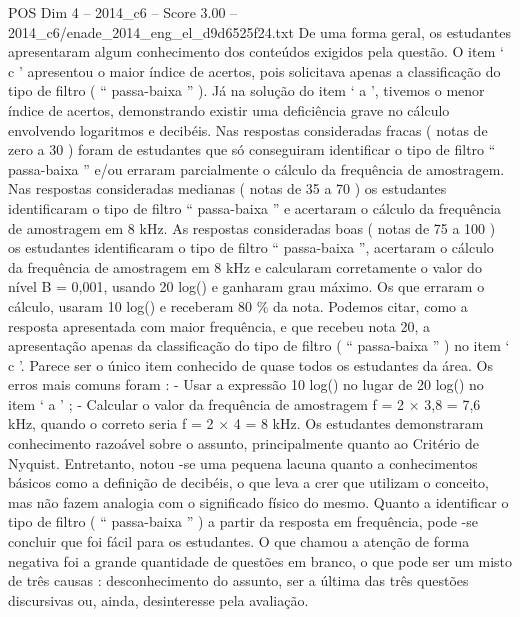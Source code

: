\begin{textsample}{POS Dim 4 – 2014\_c6 – Score 3.00 – 2014\_c6/enade\_2014\_eng\_el\_d9d6525f24.txt}
De uma forma geral, os estudantes apresentaram algum conhecimento dos conteúdos exigidos pela questão.
O item ‘ c ’ apresentou o maior índice de acertos, pois solicitava apenas a classificação do tipo de filtro ( “ passa-baixa ” ).
Já na solução do item ‘ a ’, tivemos o menor índice de acertos, demonstrando existir uma deficiência grave no cálculo envolvendo logaritmos e decibéis.
Nas respostas consideradas fracas ( notas de zero a 30 ) foram de estudantes que só conseguiram identificar o tipo de filtro “ passa-baixa ” e/ou erraram parcialmente o cálculo da frequência de amostragem.
Nas respostas consideradas medianas ( notas de 35 a 70 ) os estudantes identificaram o tipo de filtro “ passa-baixa ” e acertaram o cálculo da frequência de amostragem em 8 kHz.
As respostas consideradas boas ( notas de 75 a 100 ) os estudantes identificaram o tipo de filtro “ passa-baixa ”, acertaram o cálculo da frequência de amostragem em 8 kHz e calcularam corretamente o valor do nível B = 0,001, usando 20 log() e ganharam grau máximo.
Os que erraram o cálculo, usaram 10 log() e receberam 80 \% da nota.
Podemos citar, como a resposta apresentada com maior frequência, e que recebeu nota 20, a apresentação apenas da classificação do tipo de filtro ( “ passa-baixa ” ) no item ‘ c ’.
Parece ser o único item conhecido de quase todos os estudantes da área.
Os erros mais comuns foram : - Usar a expressão 10 log() no lugar de 20 log() no item ‘ a ’ ; - Calcular o valor da frequência de amostragem f = 2 × 3,8 = 7,6 kHz, quando o correto seria f = 2 × 4 = 8 kHz.
Os estudantes demonstraram conhecimento razoável sobre o assunto, principalmente quanto ao Critério de Nyquist.
Entretanto, notou -se uma pequena lacuna quanto a conhecimentos básicos como a definição de decibéis, o que leva a crer que utilizam o conceito, mas não fazem analogia com o significado físico do mesmo.
Quanto a identificar o tipo de filtro ( “ passa-baixa ” ) a partir da resposta em frequência, pode -se concluir que foi fácil para os estudantes.
O que chamou a atenção de forma negativa foi a grande quantidade de questões em branco, o que pode ser um misto de três causas : desconhecimento do assunto, ser a última das três questões discursivas ou, ainda, desinteresse pela avaliação.

\end{textsample}
